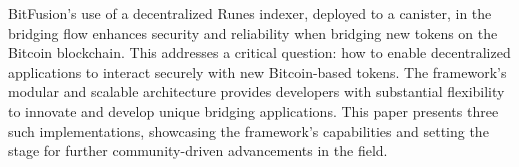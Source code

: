 \documentclass{article}
\begin{document}
BitFusion’s use of a decentralized Runes indexer, deployed to a canister, in the bridging flow enhances security and reliability when bridging new tokens on the Bitcoin blockchain. This addresses a critical question: how to enable decentralized applications to interact securely with new Bitcoin-based tokens. The framework's modular and scalable architecture provides developers with substantial flexibility to innovate and develop unique bridging applications. This paper presents three such implementations, showcasing the framework's capabilities and setting the stage for further community-driven advancements in the field.





\nocite*{}


\end{document}
